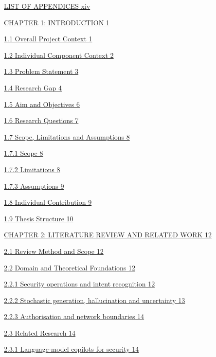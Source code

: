 \documentclass[
]{article}
\begin{document}
\protect\hyperlink{_Toc900006}{LIST OF APPENDICES xiv}

\protect\hyperlink{chapter-1-introduction}{CHAPTER 1: INTRODUCTION 1}

\protect\hyperlink{overall-project-context}{1.1 Overall Project Context
1}

\protect\hyperlink{individual-component-context}{1.2 Individual
Component Context 2}

\protect\hyperlink{problem-statement}{1.3 Problem Statement 3}

\protect\hyperlink{research-gap}{1.4 Research Gap 4}

\protect\hyperlink{aim-and-objectives}{1.5 Aim and Objectives 6}

\protect\hyperlink{research-questions}{1.6 Research Questions 7}

\protect\hyperlink{scope-limitations-and-assumptions}{1.7 Scope,
Limitations and Assumptions 8}

\protect\hyperlink{scope}{1.7.1 Scope 8}

\protect\hyperlink{limitations}{1.7.2 Limitations 8}

\protect\hyperlink{assumptions}{1.7.3 Assumptions 9}

\protect\hyperlink{individual-contribution}{1.8 Individual Contribution
9}

\protect\hyperlink{thesis-structure}{1.9 Thesis Structure 10}

\protect\hyperlink{chapter-2-literature-review-and-related-work}{CHAPTER
2: LITERATURE REVIEW AND RELATED WORK 12}

\protect\hyperlink{review-method-and-scope}{2.1 Review Method and Scope
12}

\protect\hyperlink{domain-and-theoretical-foundations}{2.2 Domain and
Theoretical Foundations 12}

\protect\hyperlink{security-operations-and-intent-recognition}{2.2.1
Security operations and intent recognition 12}

\protect\hyperlink{stochastic-generation-hallucination-and-uncertainty}{2.2.2
Stochastic generation, hallucination and uncertainty 13}

\protect\hyperlink{authorisation-and-network-boundaries}{2.2.3
Authorisation and network boundaries 14}

\protect\hyperlink{related-research}{2.3 Related Research 14}

\protect\hyperlink{language-model-copilots-for-security}{2.3.1
Language-model copilots for security 14}
\end{document}
